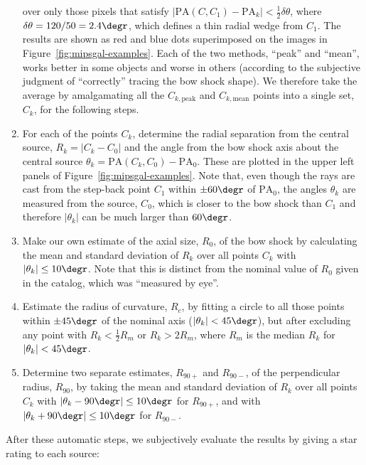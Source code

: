 \begin{enumerate}[1.]
  over only those pixels that satisfy
  \(|\text{PA}(C, C_1) - \text{PA}_k| < \frac12 \delta\theta\), where
  \(\delta\theta = 120/50 = 2.4\degr\), which defines a thin radial wedge from
  \(C_1\).  The results are shown as red and blue dots superimposed
  on the images in Figure~\ref{fig:mipsgal-examples}. Each of the two
  methods, ``peak'' and ``mean'', works better in some objects and
  worse in others (according to the subjective judgment of
  ``correctly'' tracing the bow shock shape).  We therefore take the
  average by amalgamating all the \(C_{k,\text{peak}}\) and
  \(C_{k,\text{mean}}\) points into a single set, \(C_{k}\), for
  the following steps.
\item For each of the points \(C_{k}\), determine the radial
  separation from the central source, \(R_k = |C_k - C_0|\) and the
  angle from the bow shock axis about the central source
  \(\theta_k = \text{PA}(C_k, C_0) - \text{PA}_0\).  These are plotted in
  the upper left panels of Figure~\ref{fig:mipsgal-examples}.  Note
  that, even though the rays are cast from the step-back point \(C_1\)
  within \(\pm 60\degr\) of \(\text{PA}_0\), the angles \(\theta_k\) are
  measured from the source, \(C_0\), which is closer to the bow shock
  than \(C_1\) and therefore \(|\theta_k|\) can be much larger than
  \(60\degr\).
\item Make our own estimate of the axial size, \(R_0\), of the bow
  shock by calculating the mean and standard deviation of \(R_k\) over
  all points \(C_k\) with \(|\theta_k| \le 10\degr\).  Note that this is
  distinct from the nominal value of \(R_0\) given in the
  \citet{Kobulnicky:2016a} catalog, which was ``measured by eye''.
\item Estimate the radius of curvature, \(R_c\), by fitting a circle
  to all those points within \(\pm 45\degr\) of the nominal axis
  (\(|\theta_k| < 45\degr\)), but after excluding any point with
  \(R_k < \frac12 R_m\) or \(R_k > 2 R_m\), where \(R_m\) is the median
  \(R_k\) for \(|\theta_k| < 45\degr\).
\item Determine two separate estimates, \(R_{90+}\) and \(R_{90-}\),
  of the perpendicular radius, \(R_{90}\), by taking the mean and
  standard deviation of \(R_k\) over all points \(C_k\) with
  \(|\theta_k - 90\degr| \le 10\degr\) for \(R_{90+}\), and with
  \(|\theta_k + 90\degr| \le 10\degr\) for \(R_{90-}\).
\end{enumerate}

After these automatic steps, we subjectively evaluate the results by giving a star rating to each source:

